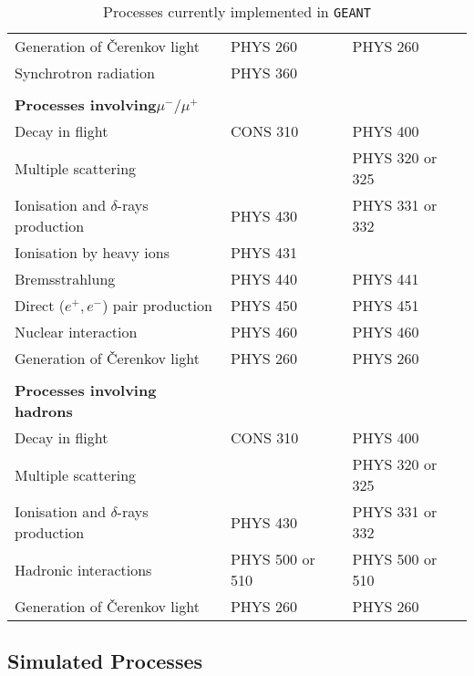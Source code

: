\begin{table}[hbt]
\begin{center}
\begin{tabular}{|l|l|l|}
Generation of \v{C}erenkov light             & PHYS 260      & PHYS 260 \\
Synchrotron radiation                       & PHYS 360      &         \\
                                            &              &           \\
{\bf Processes involving}$\mu^-/ \mu^+$     &               &          \\
Decay in flight                             & CONS 310      & PHYS 400 \\
Multiple scattering                         &               & PHYS 320
or 325 \\
Ionisation and $\delta$-rays production     & PHYS 430      & PHYS 331
or 332 \\
Ionisation by heavy ions                    & PHYS 431      &         \\
Bremsstrahlung                              & PHYS 440      & PHYS 441 \\
Direct ($ e^+,e^-$) pair production         & PHYS 450      & PHYS 451 \\
Nuclear interaction                         & PHYS 460      & PHYS 460 \\
Generation of \v{C}erenkov light             & PHYS 260      & PHYS 260 \\
                                            &              &           \\
{\bf Processes involving hadrons}           &               &          \\
Decay in flight                             & CONS 310      & PHYS 400 \\
Multiple scattering                         &               & PHYS 320
or 325 \\
Ionisation and $\delta$-rays production     & PHYS 430      & PHYS 331
or 332 \\
Hadronic interactions                       & PHYS 500 or 510&
PHYS 500 or 510  \\
Generation of \v{C}erenkov light             & PHYS 260      & PHYS 260 \\
\hline
\end{tabular}
\end{center}
\label{phys001-1}
\caption{Processes currently implemented in {\tt GEANT}}
\end{table}
 
\subsection{ Simulated Processes }
 
